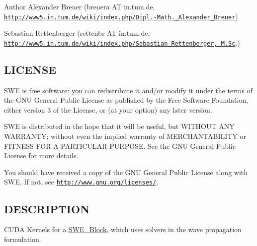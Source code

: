 \begin{DoxyAuthor}{Author}
Alexander Breuer (breuera A\-T in.\-tum.\-de, \href{http://www5.in.tum.de/wiki/index.php/Dipl.-Math._Alexander_Breuer}{\tt http\-://www5.\-in.\-tum.\-de/wiki/index.\-php/\-Dipl.-\/\-Math.\-\_\-\-Alexander\-\_\-\-Breuer}) 

Sebastian Rettenberger (rettenbs A\-T in.\-tum.\-de, \href{http://www5.in.tum.de/wiki/index.php/Sebastian_Rettenberger,_M.Sc}{\tt http\-://www5.\-in.\-tum.\-de/wiki/index.\-php/\-Sebastian\-\_\-\-Rettenberger,\-\_\-\-M.\-Sc}.)
\end{DoxyAuthor}
\hypertarget{Writer_8hh_LICENSE}{}\subsection{L\-I\-C\-E\-N\-S\-E}\label{Writer_8hh_LICENSE}
S\-W\-E is free software\-: you can redistribute it and/or modify it under the terms of the G\-N\-U General Public License as published by the Free Software Foundation, either version 3 of the License, or (at your option) any later version.

S\-W\-E is distributed in the hope that it will be useful, but W\-I\-T\-H\-O\-U\-T A\-N\-Y W\-A\-R\-R\-A\-N\-T\-Y; without even the implied warranty of M\-E\-R\-C\-H\-A\-N\-T\-A\-B\-I\-L\-I\-T\-Y or F\-I\-T\-N\-E\-S\-S F\-O\-R A P\-A\-R\-T\-I\-C\-U\-L\-A\-R P\-U\-R\-P\-O\-S\-E. See the G\-N\-U General Public License for more details.

You should have received a copy of the G\-N\-U General Public License along with S\-W\-E. If not, see \href{http://www.gnu.org/licenses/}{\tt http\-://www.\-gnu.\-org/licenses/}.\hypertarget{NetCdfWriter_8hh_DESCRIPTION}{}\subsection{D\-E\-S\-C\-R\-I\-P\-T\-I\-O\-N}\label{NetCdfWriter_8hh_DESCRIPTION}
C\-U\-D\-A Kernels for a \hyperlink{classSWE__Block}{S\-W\-E\-\_\-\-Block}, which uses solvers in the wave propagation formulation. 


